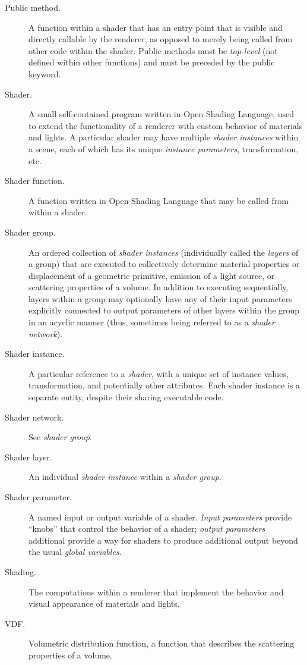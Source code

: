 \documentclass[11pt,letterpaper]{book}
\def\langname{Open Shading Language\xspace}
\begin{document}
\begin{appendix}
\begin{description}
\item[Public method.] A function within a shader that has an entry point
  that is visible and directly callable by the renderer, as opposed to
  merely being called from other code within the shader.  Public methods
  must be \emph{top-level} (not defined within other functions) and must
  be preceded by the {\cf public} keyword.

\item[Shader.] A small self-contained program written in \langname, used
  to extend the functionality of a renderer with custom behavior of
  materials and lights.  A particular shader may have multiple
  \emph{shader instances} within a scene, each of which has its unique
  \emph{instance parameters}, transformation, etc.

\item[Shader function.] A function written in \langname that may be
  called from within a shader.

\item[Shader group.] An ordered collection of \emph{shader instances}
  (individually called the \emph{layers} of a group) that are executed
  to collectively determine material properties or displacement of a
  geometric primitive, emission of a light source, or scattering
  properties of a volume.  In addition to executing sequentially, layers
  within a group may optionally have any of their input parameters
  explicitly connected to output parameters of other layers within the
  group in an acyclic manner (thus, sometimes being referred to as a
  \emph{shader network}).

\item[Shader instance.] A particular reference to a \emph{shader}, with
  a unique set of {\cf instance values}, transformation, and potentially
  other attributes.  Each shader instance is a separate entity, despite
  their sharing executable code.

\item[Shader network.] See \emph{shader group}.

\item[Shader layer.] An individual \emph{shader instance} within a
  \emph{shader group}.

\item[Shader parameter.] A named input or output variable of a shader.
  \emph{Input parameters} provide ``knobs'' that control the behavior of
  a shader; \emph{output parameters} additional provide a way for
  shaders to produce additional output beyond the usual \emph{global
    variables}.

\item[Shading.] The computations within a renderer that implement the
  behavior and visual appearance of materials and lights.

\item[VDF.] Volumetric distribution function, a function that describes
  the scattering properties of a volume.

\end{description}

\end{appendix}
\end{document}
